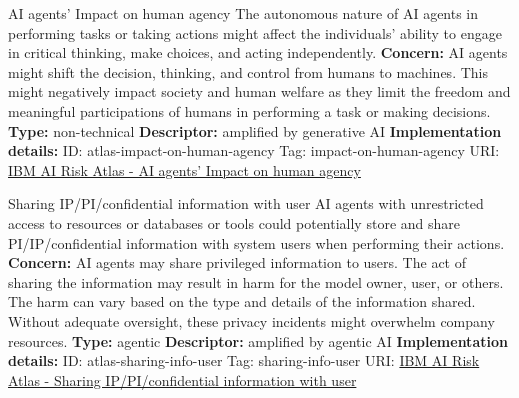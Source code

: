 \begin{definitionbox}{AI agents' Impact on human agency}
The autonomous nature of AI agents in performing tasks or taking actions might affect the individuals' ability to engage in critical thinking, make choices, and acting independently.\newline\newline
\textbf{Concern: }AI agents might shift the decision, thinking, and control from humans to machines.  This might negatively impact society and human welfare as they limit the freedom and meaningful participations of humans in performing a task or making decisions.\newline\newline
\textbf{Type: }non-technical\newline
\textbf{Descriptor: }amplified by generative AI \newline\newline
\textbf{Implementation details: } \newline
ID: atlas-impact-on-human-agency \newline
Tag: impact-on-human-agency \newline
URI:  \href{https://www.ibm.com/docs/en/watsonx/saas?topic=SSYOK8/wsj/ai-risk-atlas/impact-on-human-agency.html}{IBM AI Risk Atlas - AI agents' Impact on human agency}\newline
\end{definitionbox}
\begin{definitionbox}{Sharing IP/PI/confidential information with user}
AI agents with unrestricted access to resources or databases or tools could potentially store and share PI/IP/confidential information with system users when performing their actions.\newline\newline
\textbf{Concern: }AI agents may share privileged information to users. The act of sharing the information may result in harm for the model owner, user, or others. The harm can vary based on the type and details of the information shared. Without adequate oversight, these privacy incidents might overwhelm company resources.\newline\newline
\textbf{Type: }agentic\newline
\textbf{Descriptor: }amplified by agentic AI \newline\newline
\textbf{Implementation details: } \newline
ID: atlas-sharing-info-user \newline
Tag: sharing-info-user \newline
URI:  \href{https://www.ibm.com/docs/en/watsonx/saas?topic=SSYOK8/wsj/ai-risk-atlas/sharing-info-user.html}{IBM AI Risk Atlas - Sharing IP/PI/confidential information with user}\newline
\end{definitionbox}

